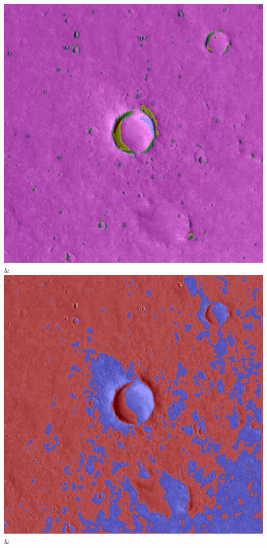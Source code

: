 \begin{table}[h!]
\begin{tabularx}{\textwidth}
		\includegraphics[width=0.9\linewidth]{images/gen/activation_functions/p03_01.png_relu.png} &
		\includegraphics[width=0.9\linewidth]{images/gen/activation_functions/p03_01.png_sigmoid.png} &

\end{tabularx}
\end{table}
